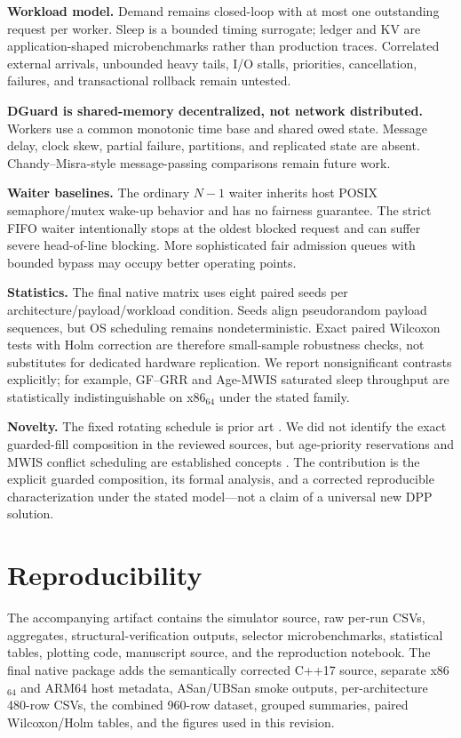 \documentclass[10pt,journal]{IEEEtran}
\begin{document}
\textbf{Workload model.} Demand remains closed-loop with at most one outstanding request per worker. Sleep is a bounded timing surrogate; ledger and KV are application-shaped microbenchmarks rather than production traces. Correlated external arrivals, unbounded heavy tails, I/O stalls, priorities, cancellation, failures, and transactional rollback remain untested.

\textbf{DGuard is shared-memory decentralized, not network distributed.} Workers use a common monotonic time base and shared owed state. Message delay, clock skew, partial failure, partitions, and replicated state are absent. Chandy--Misra-style message-passing comparisons remain future work.

\textbf{Waiter baselines.} The ordinary $N-1$ waiter inherits host POSIX semaphore/mutex wake-up behavior and has no fairness guarantee. The strict FIFO waiter intentionally stops at the oldest blocked request and can suffer severe head-of-line blocking. More sophisticated fair admission queues with bounded bypass may occupy better operating points.

\textbf{Statistics.} The final native matrix uses eight paired seeds per architecture/payload/workload condition. Seeds align pseudorandom payload sequences, but OS scheduling remains nondeterministic. Exact paired Wilcoxon tests with Holm correction are therefore small-sample robustness checks, not substitutes for dedicated hardware replication. We report nonsignificant contrasts explicitly; for example, GF--GRR and Age-MWIS saturated sleep throughput are statistically indistinguishable on x86$_{64}$ under the stated family.

\textbf{Novelty.} The fixed rotating schedule is prior art \cite{lee2023}. We did not identify the exact guarded-fill composition in the reviewed sources, but age-priority reservations and MWIS conflict scheduling are established concepts \cite{scholliers2014,paschalidis2015}. The contribution is the explicit guarded composition, its formal analysis, and a corrected reproducible characterization under the stated model---not a claim of a universal new DPP solution.

\section{Reproducibility}
The accompanying artifact contains the simulator source, raw per-run CSVs, aggregates, structural-verification outputs, selector microbenchmarks, statistical tables, plotting code, manuscript source, and the reproduction notebook. The final native package adds the semantically corrected C++17 source, separate x86$_{64}$ and ARM64 host metadata, ASan/UBSan smoke outputs, per-architecture 480-row CSVs, the combined 960-row dataset, grouped summaries, paired Wilcoxon/Holm tables, and the figures used in this revision.
\end{document}
